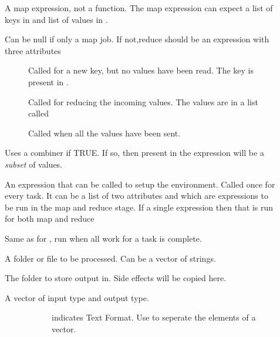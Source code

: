 \documentclass[letterpaper,10pt,english]{manual}
\begin{document}
\begin{description}
\item[]
A map expression, not a function. The map expression can expect a list of keys in  and list of values in .

\item[]
Can be null if only a map job. If not,reduce should be an expression with three attributes
\begin{description}
\item[]
Called for a new key, but no values have been read. The key is present in .

\item[]
Called for reducing the incoming values. The values are in a list called 

\item[]
Called when all the values have been sent.

\end{description}

\item[]
Uses a combiner if TRUE. If so, then  present in the  expression will be a \emph{subset} of values.

\item[]
An expression that can be called to setup the environment. Called once for every task.
It can be a list of two attributes  and  which are expressions to be run in the map and reduce stage. If a single expression then that is run for both map and reduce

\item[]
Same as for , run when all work for a task is complete.

\item[]
A folder or file to be processed. Can be a vector of strings.

\item[]
The folder to store output in. Side effects will be copied here.

\item[]\begin{description}
\item[A vector of input type and output type.]\begin{description}
\item[]
indicates Text Format. Use  to seperate the elements of a vector.


\end{description}
\end{description}
\end{description}
\end{document}
